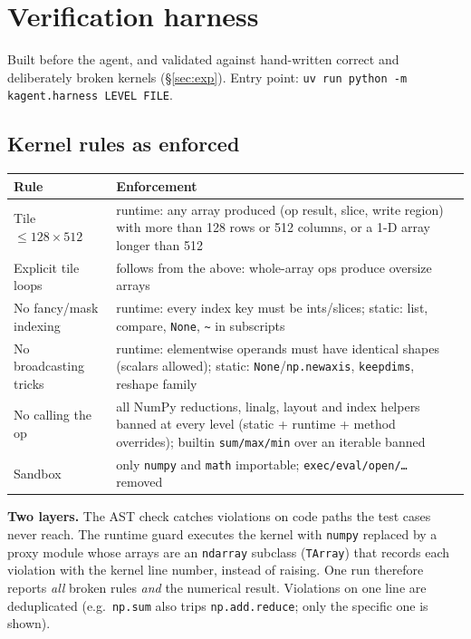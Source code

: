 \documentclass[11pt]{article}
\newcommand{\code}[1]{\texttt{#1}}
\begin{document}
\section{Verification harness}
\label{sec:harness}

Built before the agent, and validated against hand-written correct and deliberately broken
kernels (\S\ref{sec:exp}). Entry point: \code{uv run python -m kagent.harness LEVEL FILE}.

\subsection{Kernel rules as enforced}

\noindent\begin{tabularx}{\linewidth}{@{}lY@{}}
\toprule
Rule & Enforcement \\
\midrule
Tile $\leq 128\times512$ & runtime: any array produced (op result, slice, write region) with
  more than 128 rows or 512 columns, or a 1-D array longer than 512 \\
Explicit tile loops & follows from the above: whole-array ops produce oversize arrays \\
No fancy/mask indexing & runtime: every index key must be ints/slices; static: list, compare,
  \code{None}, \code{\textasciitilde} in subscripts \\
No broadcasting tricks & runtime: elementwise operands must have identical shapes (scalars
  allowed); static: \code{None}/\code{np.newaxis}, \code{keepdims}, reshape family \\
No calling the op & all NumPy reductions, linalg, layout and index helpers banned at every level
  (static + runtime + method overrides); builtin \code{sum/max/min} over an iterable banned \\
Sandbox & only \code{numpy} and \code{math} importable; \code{exec/eval/open/\dots} removed \\
\bottomrule
\end{tabularx}

\medskip
\noindent\textbf{Two layers.} The AST check catches violations on code paths the test cases
never reach. The runtime guard executes the kernel with \code{numpy} replaced by a proxy module
whose arrays are an \code{ndarray} subclass (\code{TArray}) that records each violation with the
kernel line number, instead of raising. One run therefore reports \emph{all} broken rules
\emph{and} the numerical result. Violations on one line are deduplicated (e.g.\ \code{np.sum} also
trips \code{np.add.reduce}; only the specific one is shown).
\end{document}
